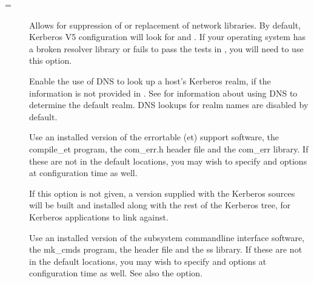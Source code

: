 \documentclass[letterpaper,10pt,english]{sphinxmanual}
\begin{document}
\begin{description}
\item[{\sphinxstylestrong{\sphinxhyphen{}}\sphinxstylestrong{\sphinxhyphen{}with\sphinxhyphen{}netlib}{[}=\sphinxstyleemphasis{libs}{]}}] \leavevmode
\sphinxAtStartPar
Allows for suppression of or replacement of network libraries.  By
default, Kerberos V5 configuration will look for  and
.  If your operating system has a broken resolver
library or fails to pass the tests in , you
will need to use this option.

\item[{\sphinxstylestrong{\sphinxhyphen{}}}] \leavevmode
\sphinxAtStartPar
Enable the use of DNS to look up a host’s Kerberos realm,
if the information is not provided in
.  See 
for information about using DNS to determine the default realm.
DNS lookups for realm names are disabled by default.

\item[{\sphinxstylestrong{\sphinxhyphen{}}}] \leavevmode
\sphinxAtStartPar
Use an installed version of the error\sphinxhyphen{}table (et) support software,
the compile\_et program, the com\_err.h header file and the com\_err
library.  If these are not in the default locations, you may wish
to specify  and
 options at configuration time as
well.

\sphinxAtStartPar
If this option is not given, a version supplied with the Kerberos
sources will be built and installed along with the rest of the
Kerberos tree, for Kerberos applications to link against.

\item[{\sphinxstylestrong{\sphinxhyphen{}}}] \leavevmode
\sphinxAtStartPar
Use an installed version of the subsystem command\sphinxhyphen{}line interface
software, the mk\_cmds program, the  header file and the
ss library.  If these are not in the default locations, you may
wish to specify  and
 options at configuration time as
well.  See also the  option.


\end{description}
\end{document}
